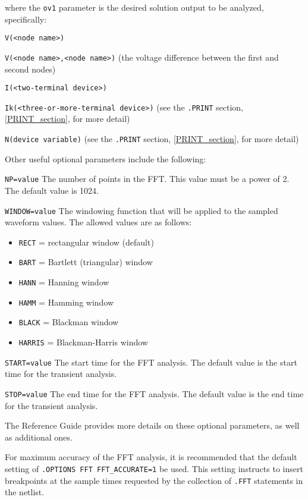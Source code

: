 {{where the \texttt{ov1} parameter is the desired solution output to be analyzed, specifically:
\begin{XyceItemize}
\item \texttt{V(<node name>)}
\item \texttt{V(<node name>,<node name>)} (the voltage difference between the first and second nodes)
\item \texttt{I(<two-terminal device>)}
\item \texttt{Ik(<three-or-more-terminal device>)} (see the \texttt{.PRINT} section, \ref{PRINT_section}, for more detail)
\item \texttt{N(device variable)} (see the \texttt{.PRINT} section, \ref{PRINT_section}, for more detail)
\end{XyceItemize}

Other useful optional parameters include the following:
\begin{XyceItemize}
  \item{\texttt{NP=value}} The number of points in the FFT.  This value must be a power of 2.
     The default value is 1024.
  \item{\texttt{WINDOW=value}} The windowing function that will be applied to the sampled waveform
values.  The allowed values are as follows:
    \begin{itemize}
      \item \texttt{RECT} = rectangular window (default)
      \item \texttt{BART} = Bartlett (triangular) window
      \item \texttt{HANN} = Hanning window
      \item \texttt{HAMM} = Hamming window
      \item \texttt{BLACK} = Blackman window
      \item \texttt{HARRIS} = Blackman-Harris window
    \end{itemize}
  \item{\texttt{START=value}} The start time for the FFT analysis. The default value is the
start time for the transient analysis.
  \item{\texttt{STOP=value}} The end time for the FFT analysis. The default value is the
end time for the transient analysis.
\end{XyceItemize}

The \Xyce{} Reference Guide\ReferenceGuide{} provides more details on these
optional parameters, as well as additional ones.

For maximum accuracy of the FFT analysis, it is recommended that the default
setting of \texttt{.OPTIONS FFT FFT\_ACCURATE=1} be used.  This setting instructs
\Xyce{} to insert breakpoints at the sample times requested by the collection of
\texttt{.FFT} statements in the netlist.  

}}
